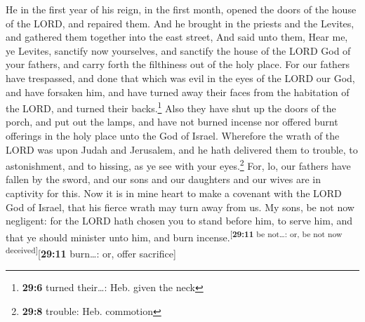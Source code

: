  He in the first year of his reign, in the first month,
opened the doors of the house of the LORD, and repaired them.
 And he brought in the priests and the Levites, and
gathered them together into the east street,  And said
unto them, Hear me, ye Levites, sanctify now yourselves, and sanctify
the house of the LORD God of your fathers, and carry forth the
filthiness out of the holy place.  For our fathers have
trespassed, and done that which was evil in the eyes of the LORD our
God, and have forsaken him, and have turned away their faces from the
habitation of the LORD, and turned their backs.\footnote{\textbf{29:6}
  turned their\ldots: Heb. given the neck}  Also they have
shut up the doors of the porch, and put out the lamps, and have not
burned incense nor offered burnt offerings in the holy place unto the
God of Israel.  Wherefore the wrath of the LORD was upon
Judah and Jerusalem, and he hath delivered them to trouble, to
astonishment, and to hissing, as ye see with your eyes.\footnote{\textbf{29:8}
  trouble: Heb. commotion}  For, lo, our fathers have
fallen by the sword, and our sons and our daughters and our wives are in
captivity for this.  Now it is in mine heart to make a
covenant with the LORD God of Israel, that his fierce wrath may turn
away from us.  My sons, be not now negligent: for the
LORD hath chosen you to stand before him, to serve him, and that ye
should minister unto him, and burn
incense.\textsuperscript{{[}\textbf{29:11} be not\ldots: or, be not now
deceived{]}}{[}\textbf{29:11} burn\ldots: or, offer sacrifice{]}

